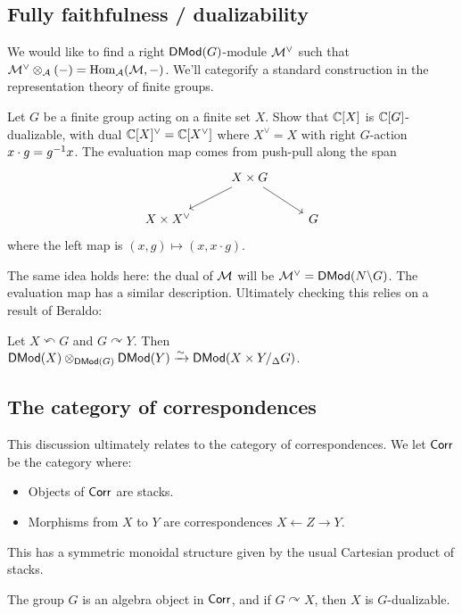 \documentclass{article}
\begin{document}
\subsection{Fully faithfulness / dualizability}

We would like to find a right $\mathsf{DMod}(G)$-module $\mathcal{M}^\vee$ such that $\mathcal{M}^\vee \otimes_{\mathcal{A}} (-) = \operatorname{Hom}_{\mathcal{A}}(\mathcal{M}, -)$.
We'll categorify a standard construction in the representation theory of finite groups.

\begin{exer}
	Let $G$ be a finite group acting on a finite set $X$.
	Show that $\mathbb{C}[X]$ is $\mathbb{C}[G]$-dualizable, with dual $\mathbb{C}[X]^\vee = \mathbb{C}[X^\vee]$ where $X^\vee = X$ with right $G$-action $x \cdot g = g^{-1} x$.
	The evaluation map comes from push-pull along the span
	\[
		\begin{tikzcd}
			& \ar[dl] X \times G \ar[dr] & \\
			X \times X^\vee & & G
		\end{tikzcd}
	\]
	where the left map is $(x, g) \mapsto (x, x \cdot g)$.
\end{exer}

The same idea holds here: the dual of $\mathcal{M}$ will be $\mathcal{M}^\vee = \mathsf{DMod}(N \backslash G)$.
The evaluation map has a similar description.
Ultimately checking this relies on a result of Beraldo: 

\begin{thm}[Beraldo]
	Let $X \curvearrowleft G$ and $G \curvearrowright Y$.
	Then $\mathsf{DMod}(X) \otimes_{\mathsf{DMod}(G)} \mathsf{DMod}(Y) \xrightarrow{\sim} \mathsf{DMod}(X \times Y /_\Delta G)$.
\end{thm}

\subsection{The category of correspondences}

This discussion ultimately relates to the category of correspondences.
We let $\mathsf{Corr}$ be the category where:
\begin{itemize}
	\item Objects of $\mathsf{Corr}$ are stacks.
	\item Morphisms from $X$ to $Y$ are correspondences $X \leftarrow Z \rightarrow Y$.
\end{itemize}
This has a symmetric monoidal structure given by the usual Cartesian product of stacks.

\begin{exer}
	The group $G$ is an algebra object in $\mathsf{Corr}$, and if $G \curvearrowright X$, then $X$ is $G$-dualizable.
\end{exer}
\end{document}
